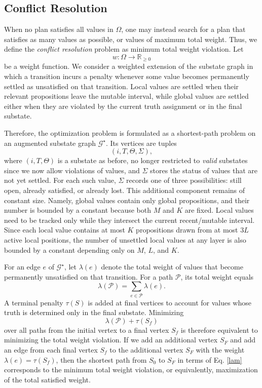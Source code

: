 \documentclass[a4paper,fleqn]{cas-dc}
\begin{document}
\subsection{Conflict Resolution}\label{softopt}

When no plan satisfies all values in $\Omega$, one may instead search for a plan that satisfies as many values as possible, or values of maximum total weight. Thus, we define
the {\it conflict resolution} problem as minimum total weight violation. Let
\[
w:\Omega \to \mathbb{R}_{\geq 0}
\]
be a weight function. We consider a weighted extension of the substate graph in which a
transition incurs a penalty whenever some value becomes permanently settled as unsatisfied on that
transition. Local values are settled when their relevant propositions leave the mutable interval,
while global values are settled either when they are violated by the current truth assignment or in the final substate.

Therefore, the optimization problem is formulated as a shortest-path problem
on an augmented substate graph $\mathcal{G}^{\star}$. Its vertices are tuples
\[
(i,T,\Theta,\Sigma),
\]
where $(i,T,\Theta)$ is a substate as before, no longer restricted to {\it valid} substates since we now allow violations of values, and $\Sigma$ stores the status of values that are not yet settled. For each such value, $\Sigma$ records one of three possibilities: still open, already satisfied, or already lost. This additional component remains of constant size. Namely, global values contain only global propositions, and their number is bounded by a constant because both $M$ and $K$ are fixed. Local values need to be tracked only while they intersect the current recent/mutable interval. Since each local value contains at most $K$ propositions drawn from at most $3L$ active local positions, the number of unsettled local values at any layer is also bounded by a constant depending only on $M$, $L$, and $K$.

For an edge $e$ of $\mathcal{G}^{\star}$, let $\lambda(e)$ denote the total weight of values that become
permanently unsatisfied on that transition. For a path $\mathcal{P}$, its total weight equals
\begin{equation}\label{lam}
\lambda(\mathcal{P})=\sum_{e\in \mathcal{P}} \lambda(e).
\end{equation}
A terminal penalty $\tau(S)$ is added at final vertices to account for values whose truth
is determined only in the final substate. Minimizing
\[
\lambda(\mathcal{P})+\tau(S_f)
\]
over all paths from the initial vertex to a final vertex $S_f$ is therefore equivalent to
minimizing the total weight violation. If we add an additional vertex $S_F$ and add an edge from each final vertex $S_f$ to
the additional vertex $S_F$ with the weight $\lambda(e)=\tau(S_f)$, then the shortest path from $S_0$ to $S_F$ in terms of
Eq. \eqref{lam} corresponds to the minimum total weight violation, or equivalently, maximization of the total satisfied weight.
\end{document}
